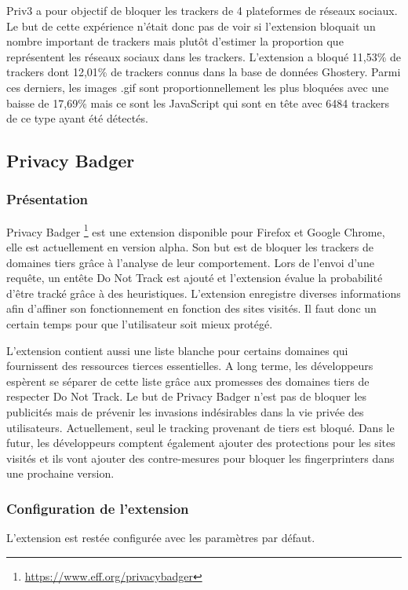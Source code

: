 Priv3 a pour objectif de bloquer les trackers de 4 plateformes de réseaux sociaux. Le but de cette expérience n'était donc pas de voir si l'extension bloquait un nombre important de trackers mais plutôt d'estimer la proportion que représentent les réseaux sociaux dans les trackers. L'extension a bloqué 11,53\% de trackers dont 12,01\% de trackers connus dans la base de données Ghostery. Parmi ces derniers, les images .gif sont proportionnellement les plus bloquées avec une baisse de 17,69\% mais ce sont les JavaScript qui sont en tête avec 6484 trackers de ce type ayant été détectés.


\subsection{Privacy Badger}
\subsubsection{Présentation}
Privacy Badger \footnote{\url{https://www.eff.org/privacybadger}} est une extension disponible pour Firefox et Google Chrome, elle est actuellement en version alpha. Son but est de bloquer les trackers de domaines tiers grâce à l'analyse de leur comportement. 
Lors de l'envoi d'une requête, un entête Do Not Track est ajouté et l'extension évalue la probabilité d'être tracké grâce à des heuristiques. L'extension enregistre diverses informations afin d'affiner son fonctionnement en fonction des sites visités. Il faut donc un certain temps pour que l'utilisateur soit mieux protégé.

L'extension contient aussi une liste blanche pour certains domaines qui fournissent des ressources tierces essentielles. A long terme, les développeurs espèrent se séparer de cette liste grâce aux promesses des domaines tiers de respecter Do Not Track. Le but de Privacy Badger n'est pas de bloquer les publicités mais de prévenir les invasions indésirables dans la vie privée des utilisateurs. 
Actuellement, seul le tracking provenant de tiers est bloqué. Dans le futur, les développeurs comptent également ajouter des protections pour les sites visités et ils vont ajouter des contre-mesures pour bloquer les fingerprinters dans une prochaine version.

\subsubsection{Configuration de l'extension}
L'extension est restée configurée avec les paramètres par défaut.

